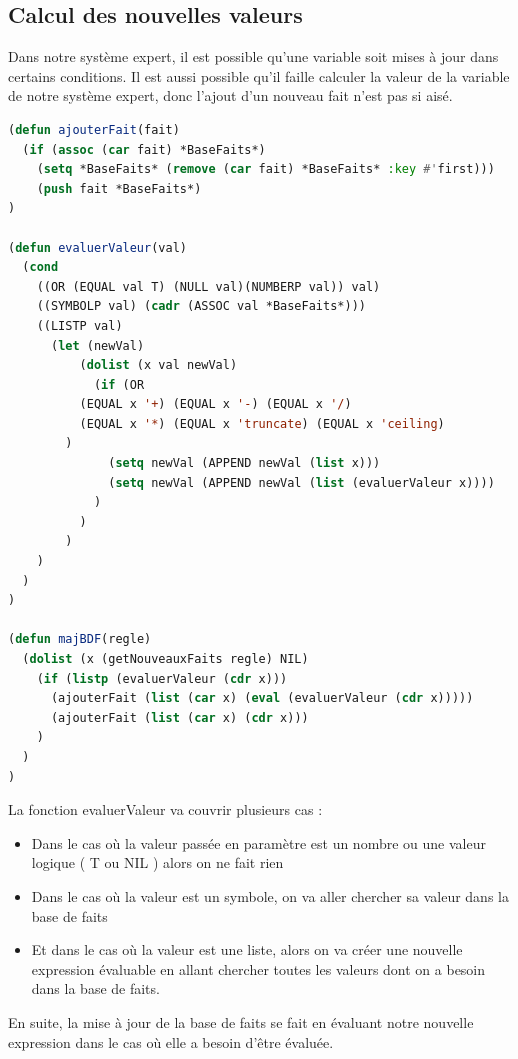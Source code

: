 \documentclass[a4paper,10pt]{report}
\begin{document}
    \subsection{Calcul des nouvelles valeurs}
    Dans notre système expert, il est possible qu'une variable soit mises à jour dans certains conditions. Il est aussi possible qu'il faille calculer la valeur 
    de la variable de notre système expert, donc l'ajout d'un nouveau fait n'est pas si aisé. 
    \begin{lstlisting}[basicstyle = \footnotesize, language=Lisp]
(defun ajouterFait(fait)
  (if (assoc (car fait) *BaseFaits*)
    (setq *BaseFaits* (remove (car fait) *BaseFaits* :key #'first)))
    (push fait *BaseFaits*)
)

(defun evaluerValeur(val)
  (cond
    ((OR (EQUAL val T) (NULL val)(NUMBERP val)) val)
    ((SYMBOLP val) (cadr (ASSOC val *BaseFaits*)))
    ((LISTP val)
      (let (newVal)
          (dolist (x val newVal)
            (if (OR 
		  (EQUAL x '+) (EQUAL x '-) (EQUAL x '/) 
		  (EQUAL x '*) (EQUAL x 'truncate) (EQUAL x 'ceiling)
		)
              (setq newVal (APPEND newVal (list x)))
              (setq newVal (APPEND newVal (list (evaluerValeur x))))
            )
          )
        )
    )
  )
)

(defun majBDF(regle)
  (dolist (x (getNouveauxFaits regle) NIL)
    (if (listp (evaluerValeur (cdr x)))
      (ajouterFait (list (car x) (eval (evaluerValeur (cdr x)))))
      (ajouterFait (list (car x) (cdr x)))
    )
  )
)

    \end{lstlisting}

    La fonction evaluerValeur va couvrir plusieurs cas : 
    \begin{itemize}
     \item Dans le cas où la valeur passée en paramètre est un nombre ou une valeur logique ( T ou NIL ) alors on ne fait rien
     \item Dans le cas où la valeur est un symbole, on va aller chercher sa valeur dans la base de faits
     \item Et dans le cas où la valeur est une liste, alors on va créer une nouvelle expression évaluable en allant chercher toutes les valeurs dont on a besoin dans la base de faits.
    \end{itemize}
    
    En suite, la mise à jour de la base de faits se fait en évaluant notre nouvelle expression dans le cas où elle a besoin d'être évaluée.
\end{document}
